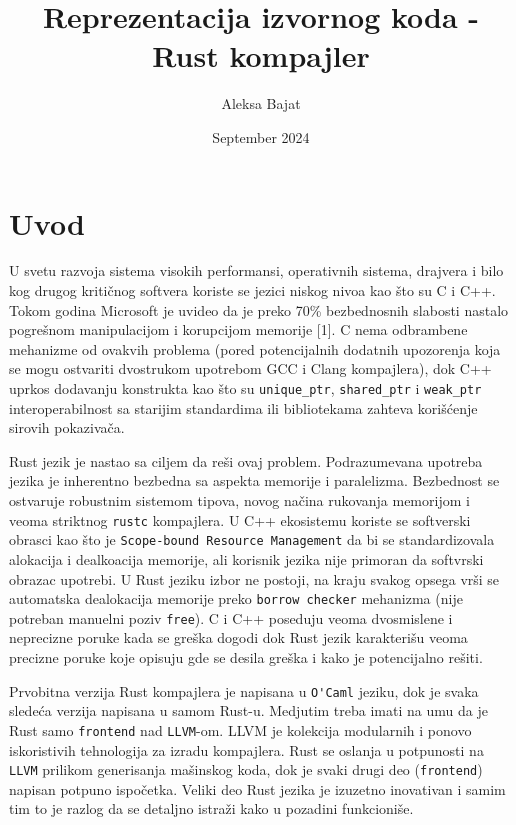 \documentclass{article}
\title{Reprezentacija izvornog koda - Rust kompajler}
\author{Aleksa Bajat}
\date{September 2024}
\begin{document}
\maketitle

\section{Uvod}

U svetu razvoja sistema visokih performansi, operativnih sistema, drajvera i bilo kog drugog kritičnog softvera koriste se jezici niskog nivoa kao što su C i C++.
Tokom godina Microsoft je uvideo da je preko 70\% bezbednosnih slabosti nastalo pogrešnom manipulacijom i korupcijom memorije [1]. 
C nema odbrambene mehanizme od ovakvih problema (pored potencijalnih dodatnih upozorenja koja se mogu ostvariti dvostrukom upotrebom GCC i Clang kompajlera), dok C++ uprkos dodavanju konstrukta kao što su \verb|unique_ptr|, \verb|shared_ptr| i \verb|weak_ptr| interoperabilnost sa starijim standardima ili bibliotekama zahteva korišćenje sirovih pokazivača. 

Rust jezik je nastao sa ciljem da reši ovaj problem. Podrazumevana upotreba jezika je inherentno bezbedna sa aspekta memorije i paralelizma. Bezbednost se ostvaruje robustnim sistemom tipova, novog načina rukovanja memorijom i veoma striktnog \verb|rustc| kompajlera.
U C++ ekosistemu koriste se softverski obrasci kao što je \verb|Scope-bound Resource Management| da bi se standardizovala alokacija i dealkoacija memorije, ali korisnik jezika nije primoran da softvrski obrazac upotrebi. U Rust jeziku izbor ne postoji, na kraju svakog opsega vrši se automatska dealokacija memorije preko \verb|borrow checker| mehanizma (nije potreban manuelni poziv \verb|free|).
C i C++ poseduju veoma dvosmislene i neprecizne poruke kada se greška dogodi dok Rust jezik karakterišu veoma precizne poruke koje opisuju gde se desila greška i kako je potencijalno rešiti.

Prvobitna verzija Rust kompajlera je napisana u \verb|O'Caml| jeziku, dok je svaka sledeća verzija napisana u samom Rust-u.
Medjutim treba imati na umu da je Rust samo \verb|frontend| nad \verb|LLVM|-om. LLVM je kolekcija modularnih i ponovo iskoristivih tehnologija za izradu kompajlera. Rust se oslanja u potpunosti na \verb|LLVM| prilikom generisanja mašinskog koda, dok je svaki drugi deo
(\verb|frontend|) napisan potpuno ispočetka.
Veliki deo Rust jezika je izuzetno inovativan i samim tim to je razlog da se detaljno istraži kako u pozadini funkcioniše.
\end{document}

